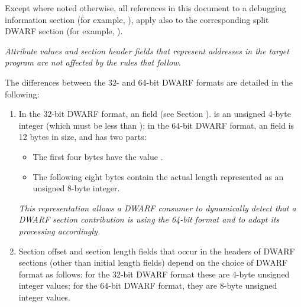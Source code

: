 Except where noted otherwise, all references in this document
to a debugging information section (for example, \dotdebuginfo),
apply also to the corresponding split DWARF section (for example,
\dotdebuginfodwo).

\bb
\textit{Attribute values and section header fields that represent
addresses in the target program are not affected by the rules that 
follow.}
\eb

The differences between the 32- and 64-bit DWARF formats are
detailed in the following:
\begin{enumerate}[1. ]

\item  In the 32-bit DWARF format, an 
 field 
\bb
(see Section ).
\eb
is an unsigned 4-byte integer (which
must be less than \xfffffffzero); in the 64-bit DWARF format,
an  field is 12 bytes in size,
and has two parts:
\begin{itemize}
\item The first four bytes have the value \xffffffff.

\item  The following eight bytes contain the actual length
represented as an unsigned 8-byte integer.
\end{itemize}

\textit{This representation allows a DWARF consumer to dynamically
detect that a DWARF section contribution is using the 64-bit
format and to adapt its processing accordingly.}

\item \hypertarget{datarep:sectionoffsetlength}{}
Section offset and section length
fields that occur
in the headers of DWARF sections (other than initial length
fields) 
\bb
depend on the choice of DWARF format as follows: for
\eb
the 32-bit DWARF format these are 4-byte unsigned integer values; 
\bb
for
\eb
the 64-bit DWARF format, they are 8-byte unsigned integer values.


\end{enumerate}

